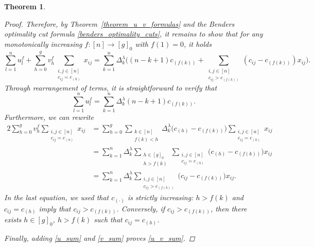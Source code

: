 \documentclass[letterpaper]{article}
\newtheorem{theorem}{Theorem}[section]
\begin{document}
\begin{theorem}
\begin{proof}
        Therefore, by Theorem~\ref{theorem_u_v_formulas} and the Benders optimality cut formula \eqref{benders_optimality_cuts}, it remains to show that for any monotonically increasing $f: [n] \rightarrow [g]_0$ with $f(1) = 0$, it holds 
        \begin{equation}\label{u_v_sum}
            \sum_{l = 1}^n u^f_l + \sum_{h = 0}^g v^f_h \sum_{\substack{i,j \in [n] \\ c_{ij} = c_{(h)}}} x_{ij} = \sum_{k = 1}^n \Delta_k^\lambda \bigg( (n-k+1) c_{(f(k))} + \sum_{\substack{i,j \in [n] \\ c_{ij} > c_{(f(k))}}} (c_{ij} -  c_{(f(k))}) x_{ij} \bigg).
        \end{equation}
        Through rearrangement of terms, it is straightforward to verify that
        \begin{equation}\label{u_sum}
            \sum_{l = 1}^n u^f_l = \sum_{k = 1}^n \Delta_k^\lambda (n-k+1) c_{(f(k))}.
        \end{equation}
        Furthermore, we can rewrite
        {\allowdisplaybreaks
        \begin{alignat}{2}\label{v_sum}
            \sum_{h = 0}^g v^f_h \sum_{\substack{i,j \in [n] \\ c_{ij} = c_{(h)}}} x_{ij} &= \sum_{h = 0}^g \sum_{\substack{k \in [n] \\ f(k) < h}} \Delta_k^\lambda \bigl( c_{(h)} - c_{(f(k))} \bigr) \sum_{\substack{i,j \in [n] \\ c_{ij} = c_{(h)}}} x_{ij} \nonumber \\
            &= \sum_{k=1}^n \Delta_k^\lambda \sum_{\substack{h \in [g]_0 \\ h > f(k)}} \sum_{\substack{i,j \in [n] \\ c_{ij} = c_{(h)}}} \bigl( c_{(h)} - c_{(f(k))} \bigr) x_{ij} \nonumber \\
            &= \sum_{k=1}^n \Delta_k^\lambda \sum_{\substack{i,j \in [n] \\ c_{ij} > c_{(f(k))}}} \bigl( c_{ij} - c_{(f(k))} \bigr) x_{ij}.
        \end{alignat}
        }
        In the last equation, we used that $c_{(\cdot)}$ is strictly increasing: $h > f(k)$ and $c_{ij} = c_{(h)}$ imply that $c_{ij} > c_{(f(k))}$. Conversely, if $c_{ij} > c_{(f(k))}$, then there exists $h \in [g]_0$, $h > f(k)$ such that $c_{ij} = c_{(h)}$.
        
        Finally, adding \eqref{u_sum} and \eqref{v_sum} proves \eqref{u_v_sum}.
    \end{proof}
\end{theorem}
\end{document}
